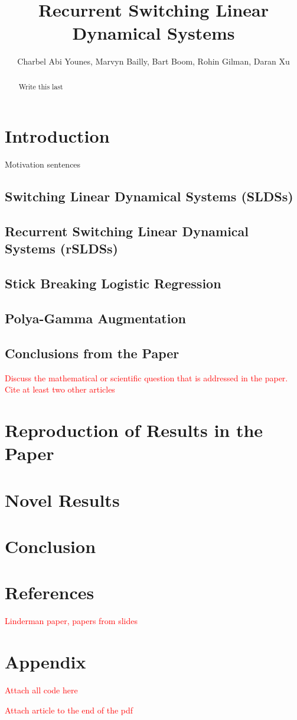 \documentclass{amsart}
\title{Recurrent Switching Linear Dynamical Systems}
\author{Charbel Abi Younes, Marvyn Bailly, Bart Boom, Rohin Gilman, Daran Xu}
\date{}
\begin{document}
\begin{abstract}
	Write this last
\end{abstract}

\maketitle

\section{Introduction}

Motivation sentences

\subsection{Switching Linear Dynamical Systems (SLDSs)}

\subsection{Recurrent Switching Linear Dynamical Systems (rSLDSs)}

\subsection{Stick Breaking Logistic Regression}

\subsection{Polya-Gamma Augmentation}

\subsection{Conclusions from the Paper}

\textcolor{red}{Discuss the mathematical or scientific question that is addressed in the paper. Cite at least two other articles}

\section{Reproduction of Results in the Paper}

\section{Novel Results}

\section{Conclusion}

\section{References}

\textcolor{red}{Linderman paper, papers from slides}

\section{Appendix}

\textcolor{red}{Attach all code here}

\textcolor{red}{Attach article to the end of the pdf}
\end{document}

